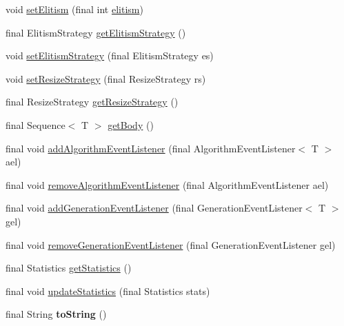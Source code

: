\begin{DoxyCompactItemize}
\item 
void \hyperlink{classjenes_1_1_genetic_algorithm_3_01_t_01extends_01_chromosome_01_4_a27f67506714b18eb15d890bfa3d5b0ab}{set\-Elitism} (final int \hyperlink{classjenes_1_1_genetic_algorithm_3_01_t_01extends_01_chromosome_01_4_ac4280b01e7da0ddc049050b19e28b8b9}{elitism})
\item 
final Elitism\-Strategy \hyperlink{classjenes_1_1_genetic_algorithm_3_01_t_01extends_01_chromosome_01_4_ad227ba9924206ee18f69d24ea4ee4ab0}{get\-Elitism\-Strategy} ()
\item 
void \hyperlink{classjenes_1_1_genetic_algorithm_3_01_t_01extends_01_chromosome_01_4_aedc89ba915f6a528ef4052eb31a8c467}{set\-Elitism\-Strategy} (final Elitism\-Strategy es)
\item 
void \hyperlink{classjenes_1_1_genetic_algorithm_3_01_t_01extends_01_chromosome_01_4_a685af9b6322920d9431977fd25c5cf77}{set\-Resize\-Strategy} (final Resize\-Strategy rs)
\item 
final Resize\-Strategy \hyperlink{classjenes_1_1_genetic_algorithm_3_01_t_01extends_01_chromosome_01_4_a379c5a3789ba72941a081d32fbcc4474}{get\-Resize\-Strategy} ()
\item 
final Sequence$<$ T $>$ \hyperlink{classjenes_1_1_genetic_algorithm_3_01_t_01extends_01_chromosome_01_4_aeab54a329fb6df5686a2fce4a8a8727a}{get\-Body} ()
\item 
final void \hyperlink{classjenes_1_1_genetic_algorithm_3_01_t_01extends_01_chromosome_01_4_a168e2b37b5351108e62d8fb887e1fae4}{add\-Algorithm\-Event\-Listener} (final Algorithm\-Event\-Listener$<$ T $>$ ael)
\item 
final void \hyperlink{classjenes_1_1_genetic_algorithm_3_01_t_01extends_01_chromosome_01_4_a8cab61e04f54ed5abbda047815a1683d}{remove\-Algorithm\-Event\-Listener} (final Algorithm\-Event\-Listener ael)
\item 
final void \hyperlink{classjenes_1_1_genetic_algorithm_3_01_t_01extends_01_chromosome_01_4_aa39f1ae905e67a5a3f7d7ad5cb25d276}{add\-Generation\-Event\-Listener} (final Generation\-Event\-Listener$<$ T $>$ gel)
\item 
final void \hyperlink{classjenes_1_1_genetic_algorithm_3_01_t_01extends_01_chromosome_01_4_a33e632148218289d0bc43e202a804bf1}{remove\-Generation\-Event\-Listener} (final Generation\-Event\-Listener gel)
\item 
final Statistics \hyperlink{classjenes_1_1_genetic_algorithm_3_01_t_01extends_01_chromosome_01_4_a484fcdba7cf2e4aa4a6ec1c0006e2193}{get\-Statistics} ()
\item 
final void \hyperlink{classjenes_1_1_genetic_algorithm_3_01_t_01extends_01_chromosome_01_4_a8a4f4965c968047c55a8b56240267a4f}{update\-Statistics} (final Statistics stats)
\item 
\hypertarget{classjenes_1_1_genetic_algorithm_3_01_t_01extends_01_chromosome_01_4_af847a2a8cba2288fbddf726ec12eaf47}{final String {\bfseries to\-String} ()}\label{classjenes_1_1_genetic_algorithm_3_01_t_01extends_01_chromosome_01_4_af847a2a8cba2288fbddf726ec12eaf47}

\end{DoxyCompactItemize}
